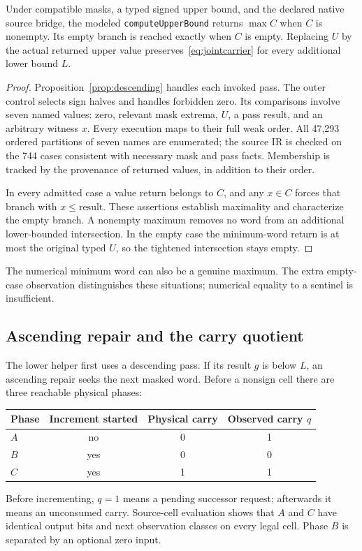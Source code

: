 \begin{theorem}\label{thm:upper}
Under compatible masks, a typed signed upper bound, and the declared native source bridge, the modeled \texttt{computeUpperBound} returns $\max C$ when $C$ is nonempty. Its empty branch is reached exactly when $C$ is empty. Replacing $U$ by the actual returned upper value preserves~\eqref{eq:jointcarrier} for every additional lower bound $L$.
\end{theorem}
\begin{proof}
Proposition~\ref{prop:descending} handles each invoked pass. The outer control selects sign halves and handles forbidden zero. Its comparisons involve seven named values: zero, relevant mask extrema, $U$, a pass result, and an arbitrary witness $x$. Every execution maps to their full weak order. All 47,293 ordered partitions of seven names are enumerated; the source IR is checked on the 744 cases consistent with necessary mask and pass facts. Membership is tracked by the provenance of returned values, in addition to their order.

In every admitted case a value return belongs to $C$, and any $x\in C$ forces that branch with $x\le\mathrm{result}$. These assertions establish maximality and characterize the empty branch. A nonempty maximum removes no word from an additional lower-bounded intersection. In the empty case the minimum-word return is at most the original typed $U$, so the tightened intersection stays empty.
\end{proof}

The numerical minimum word can also be a genuine maximum. The extra empty-case observation distinguishes these situations; numerical equality to a sentinel is insufficient.

\subsection{Ascending repair and the carry quotient}
The lower helper first uses a descending pass. If its result $g$ is below $L$, an ascending repair seeks the next masked word. Before a nonsign cell there are three reachable physical phases:
\begin{center}\small
\begin{tabular}{@{}lccc@{}}
\toprule
Phase & Increment started & Physical carry & Observed carry $q$\\
\midrule
$A$ & no & 0 & 1\\
$B$ & yes & 0 & 0\\
$C$ & yes & 1 & 1\\
\bottomrule
\end{tabular}
\end{center}
Before incrementing, $q=1$ means a pending successor request; afterwards it means an unconsumed carry. Source-cell evaluation shows that $A$ and $C$ have identical output bits and next observation classes on every legal cell. Phase $B$ is separated by an optional zero input.


